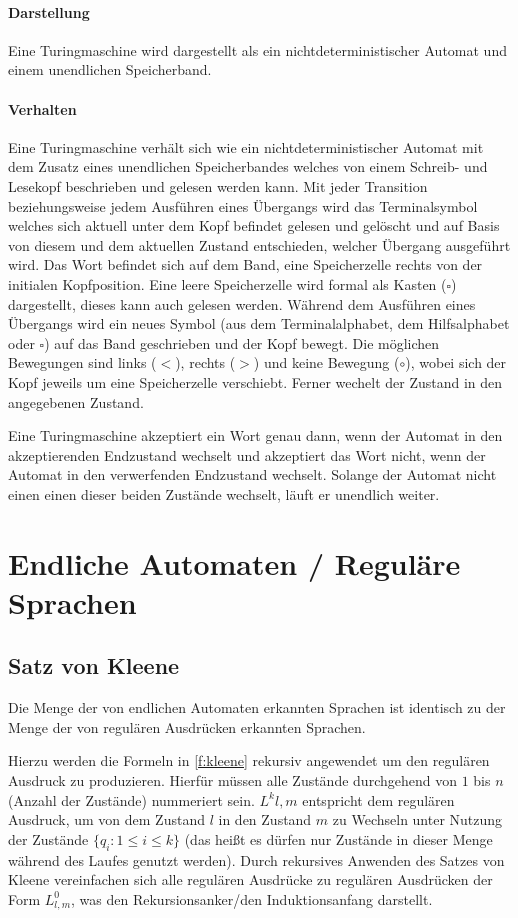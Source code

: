 		\paragraph{Darstellung}
			Eine Turingmaschine wird dargestellt als ein nichtdeterministischer Automat und einem unendlichen Speicherband.

		\paragraph{Verhalten}
			Eine Turingmaschine verhält sich wie ein nichtdeterministischer Automat mit dem Zusatz eines unendlichen Speicherbandes welches von einem Schreib- und Lesekopf beschrieben und gelesen werden kann. Mit jeder Transition beziehungsweise jedem Ausführen eines Übergangs wird das Terminalsymbol welches sich aktuell unter dem Kopf befindet gelesen und gelöscht und auf Basis von diesem und dem aktuellen Zustand entschieden, welcher Übergang ausgeführt wird. Das Wort befindet sich auf dem Band, eine Speicherzelle rechts von der initialen Kopfposition. Eine leere Speicherzelle wird formal als Kasten ($ \square $) dargestellt, dieses kann auch gelesen werden. Während dem Ausführen eines Übergangs wird ein neues Symbol (aus dem Terminalalphabet, dem Hilfsalphabet oder $ \square $) auf das Band geschrieben und der Kopf bewegt. Die möglichen Bewegungen sind links ($ < $), rechts ($ > $) und keine Bewegung ($ \circ $), wobei sich der Kopf jeweils um eine Speicherzelle verschiebt. Ferner wechelt der Zustand in den angegebenen Zustand.

			Eine Turingmaschine akzeptiert ein Wort genau dann, wenn der Automat in den akzeptierenden Endzustand wechselt und akzeptiert das Wort nicht, wenn der Automat in den verwerfenden Endzustand wechselt. Solange der Automat nicht einen einen dieser beiden Zustände wechselt, läuft er unendlich weiter.


\section{Endliche Automaten / Reguläre Sprachen}
	\subsection{Satz von Kleene}
		Die Menge der von endlichen Automaten erkannten Sprachen ist identisch zu der Menge der von regulären Ausdrücken erkannten Sprachen.

		Hierzu werden die Formeln in \ref{f:kleene} rekursiv angewendet um den regulären Ausdruck zu produzieren. Hierfür müssen alle Zustände durchgehend von $ 1 $ bis $ n $ (Anzahl der Zustände) nummeriert sein. $ L ^ k  { l, m } $ entspricht dem regulären Ausdruck, um von dem Zustand $ l $ in den Zustand $ m $ zu Wechseln unter Nutzung der Zustände $ \{ q _ i : 1 \leq i \leq k \} $ (das heißt es dürfen nur Zustände in dieser Menge während des Laufes genutzt werden). Durch rekursives Anwenden des Satzes von Kleene vereinfachen sich alle regulären Ausdrücke zu regulären Ausdrücken der Form $ L ^ 0 _ { l, m } $, was den Rekursionsanker/den Induktionsanfang darstellt.


